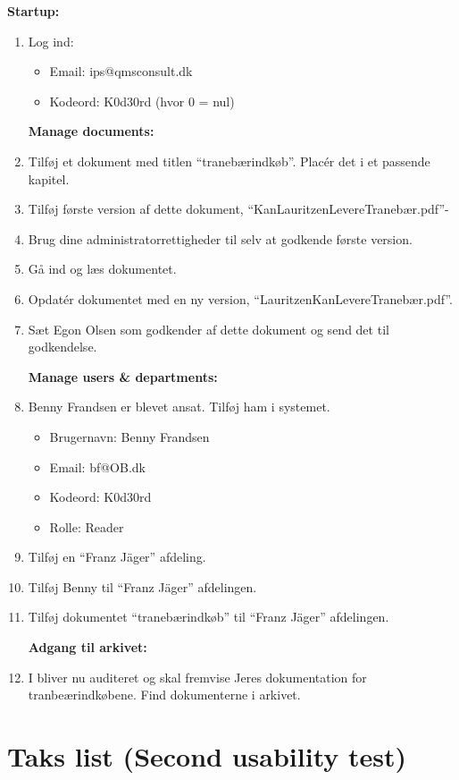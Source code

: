 \textbf{Startup:}
\begin{enumerate}
	\item Log ind:
		\begin{itemize}
			\item Email: ips@qmsconsult.dk
			\item Kodeord: K0d30rd   (hvor 0 = nul)
		\end{itemize}

\textbf{Manage documents:}
	\item Tilføj et dokument med titlen “tranebærindkøb”. Placér det i et passende kapitel.
	\item Tilføj første version af dette dokument, “KanLauritzenLevereTranebær.pdf”-
	\item Brug dine administratorrettigheder til selv at godkende første version.
	\item Gå ind og læs dokumentet.
	\item Opdatér dokumentet med en ny version, “LauritzenKanLevereTranebær.pdf”.
	\item Sæt Egon Olsen som godkender af dette dokument og send det til godkendelse.

\textbf{Manage users \& departments:}
	\item Benny Frandsen er blevet ansat. Tilføj ham i systemet.
		\begin{itemize}
			\item Brugernavn: Benny Frandsen
			\item Email: bf@OB.dk
			\item Kodeord: K0d30rd
			\item Rolle: Reader
		\end{itemize}
	\item Tilføj en “Franz Jäger” afdeling.
	\item Tilføj Benny til “Franz Jäger” afdelingen.
	\item Tilføj dokumentet “tranebærindkøb” til “Franz Jäger” afdelingen.

\textbf{Adgang til arkivet:}
	\item I bliver nu auditeret og skal fremvise Jeres dokumentation for tranbeærindkøbene. Find dokumenterne i arkivet.
\end{enumerate}


\section{Taks list (Second usability test)}

